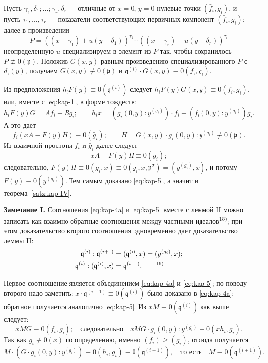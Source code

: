 \documentclass[11pt]{article}
\theoremstyle{plain}
\begin{document}
Пусть $\gamma_{1}, \delta_{1}; \ldots; \gamma_{r}, \delta_{r}$ ---
отличные от $x = 0$, $y = 0$ нулевые точки
$(\bar{f}_{i}, \bar{g}_{i})$, и пусть
$\tau_{1}, \ldots, \tau_{r}$ --- показатели соответствующих
первичных компонент $(\bar{f}_{i}, \bar{g}_{i})$; далее в произведении
\[
P = ((x-\gamma_{1}) + u(y-\delta_{1}))^{\tau_{1}} \cdots
((x-\gamma_{r}) + u(y-\delta_{r}))^{\tau_{r}}
\]
неопределенную $u$ специализируем в элемент из $P$ так, чтобы
сохранилось $P \not\equiv 0(\mathfrak{p})$. Положив $G(x,y)$ равным
произведению специализированного $P$ с $d_{i}(y)$, получаем
$G(x,y) \not\equiv 0(\mathfrak{p})$ и
$\mathfrak{q}^{(i)} \cdot G(x,y) \equiv 0(f_{i}, g_{i})$.

Из предположения $h_{i}F(y) \equiv 0(\mathfrak{q}^{(i)})$ следует
$h_{i}F(y)G(x,y) \equiv 0(f_{i}, g_{i})$, или, вместе с
\eqref{eq:kap-1}, в форме тождеств:
\[
h_{i}F(y)G = Af_{i} + Bg_{i}; \qquad
h_{i}x = (g_{i}(0,y):y^{(g_{i})})\cdot f_{i}
       - (f_{i}(0,y):y^{(g_{i})})g_{i}.
\]
А это дает
\[
\bar{f}_{i}(xA - F(y)H) \equiv 0(\bar{g}_{i}); \qquad
H = G(x,y) \cdot g_{i}(0,y):y^{(g_{i})} \not\equiv 0(\mathfrak{p}).
\]
Из взаимной простоты $\bar{f}_{i}$ и $\bar{g}_{i}$ далее следует
\[
xA - F(y)H \equiv 0(\bar{g}_{i});
\]
следовательно,
$F(y)H \equiv 0(\bar{g}_{i}, x)
\equiv 0(\bar{g}_{i}, x, \mathfrak{p}^{\sigma})
= (y^{(g_{i})}, x)$, и потому $F(y) \equiv 0(y^{(g_{i})})$.
Тем самым доказано \eqref{eq:kap-5}, а значит и
теорема~\ref{satz:kap-IV}.

\smallskip
\textbf{Замечание I.} Соотношения \eqref{eq:kap-4a} и
\eqref{eq:kap-5} вместе с леммой II можно записать как взаимно
обратные соотношения между частными идеалов\textsuperscript{15)};
при этом доказательство второго соотношения одновременно дает
доказательство леммы II:
\begin{equation}\label{eq:kap-6}
\begin{aligned}
\mathfrak{q}^{(i)} : \mathfrak{q}^{(i+1)}
  &= (\mathfrak{q}^{(i)}, x) = (y^{(g_{i})}, x);\\
\mathfrak{q}^{(i)} : (\mathfrak{q}^{(i)}, x)
  &= \mathfrak{q}^{(i+1)}.\qquad\text{\textsuperscript{16)}}
\end{aligned}
\end{equation}

Первое соотношение является объединением \eqref{eq:kap-4a} и
\eqref{eq:kap-5}; по поводу второго надо заметить:
$x \cdot \mathfrak{q}^{(i+1)} \equiv 0(\mathfrak{q}^{(i)})$ было
доказано в \eqref{eq:kap-4a}; обратное получается аналогично
\eqref{eq:kap-5}. Из $xM \equiv 0(\mathfrak{q}^{(i)})$ как выше
следует:
\[
xMG \equiv 0(f_{i}, g_{i}); \quad \text{следовательно}\quad
xMG \cdot g_{i}(0,y):y^{(g_{i})} \equiv 0(xh_{i}, g_{i}).
\]
Так как $g_{i} \not\equiv 0(x)$ по определению, именно
$(f_{i}) \geq (g_{i})$, отсюда получается
\[
M \cdot (G \cdot g_{i}(0,y):y^{(g_{i})})
\equiv 0(h_{i}, g_{i}) \equiv 0(\mathfrak{q}^{(i+1)}),
\quad \text{то есть}\quad M \equiv 0(\mathfrak{q}^{(i+1)}).
\]
\end{document}
